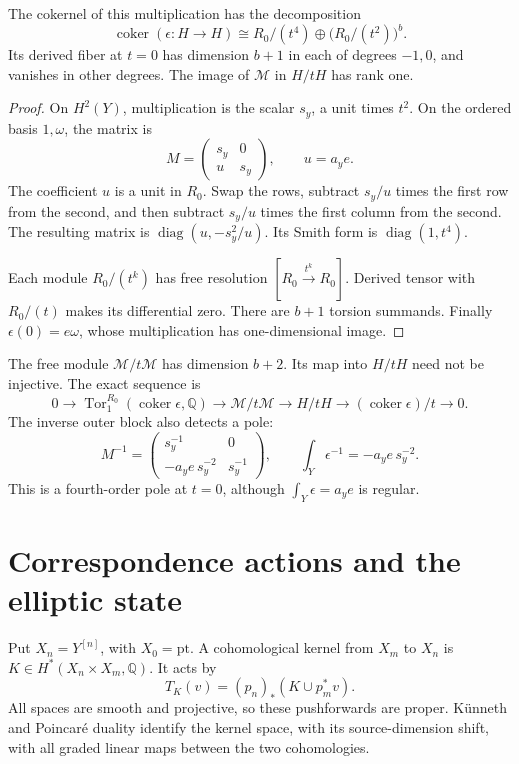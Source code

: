 \begin{proposition}\label{mht:prop:compact-smith}
The cokernel of this multiplication has the decomposition
\[
 \operatorname{coker}(\epsilon:H\to H)
   \cong R_0/(t^4)\oplus\bigl(R_0/(t^2)\bigr)^b.
\]
Its derived fiber at \(t=0\) has dimension \(b+1\) in
each of degrees \(-1,0\), and vanishes in other degrees.
The image of \(\mathcal M\) in \(H/tH\) has rank one.
\end{proposition}
\begin{proof}
On \(H^2(Y)\), multiplication is the scalar \(s_y\), a unit
times \(t^2\). On the ordered basis \(1,\omega\), the matrix is
\[
 M=\begin{pmatrix}s_y&0\\u&s_y\end{pmatrix},\qquad u=a_ye.
\]
The coefficient \(u\) is a unit in \(R_0\).
Swap the rows, subtract \(s_y/u\) times the first row from
the second, and then subtract \(s_y/u\) times the first
column from the second. The resulting matrix is
\(\operatorname{diag}(u,-s_y^2/u)\).
Its Smith form is \(\operatorname{diag}(1,t^4)\).

Each module \(R_0/(t^k)\) has free resolution
\([R_0\xrightarrow{t^k}R_0]\).
Derived tensor with \(R_0/(t)\) makes its differential zero.
There are \(b+1\) torsion summands.
Finally \(\epsilon(0)=e\omega\), whose multiplication has
one-dimensional image.
\end{proof}

The free module \(\mathcal M/t\mathcal M\) has dimension \(b+2\).
Its map into \(H/tH\) need not be injective.
The exact sequence is
\[
 0\longrightarrow\operatorname{Tor}_1^{R_0}
        (\operatorname{coker}\epsilon,\mathbb Q)
 \longrightarrow\mathcal M/t\mathcal M
 \longrightarrow H/tH
 \longrightarrow(\operatorname{coker}\epsilon)/t
 \longrightarrow0.
\]
The inverse outer block also detects a pole:
\[
 M^{-1}=
 \begin{pmatrix}s_y^{-1}&0\\-a_ye\,s_y^{-2}&s_y^{-1}\end{pmatrix},
 \qquad
 \int_Y\epsilon^{-1}=-a_ye\,s_y^{-2}.
\]
This is a fourth-order pole at \(t=0\), although
\(\int_Y\epsilon=a_ye\) is regular.

\section{Correspondence actions and the elliptic state}

Put \(X_n=Y^{[n]}\), with \(X_0=\mathrm{pt}\).
A cohomological kernel from \(X_m\) to \(X_n\) is
\(K\in H^*(X_n\times X_m,\mathbb Q)\).
It acts by
\[
 T_K(v)=(p_n)_*(K\cup p_m^*v).
\]
All spaces are smooth and projective, so these pushforwards
are proper. K\"unneth and Poincar\'e duality identify the kernel
space, with its source-dimension shift, with all graded linear
maps between the two cohomologies.

